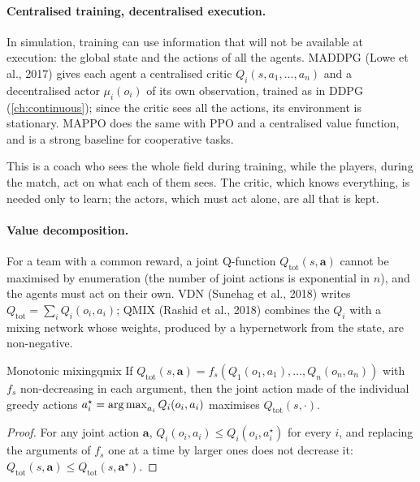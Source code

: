 \paragraph{Centralised training, decentralised execution.} In simulation,
training can use information that will not be available at execution: the
global state and the actions of all the agents. MADDPG (Lowe et al., 2017)
gives each agent a centralised critic $Q_i(s, a_1, \dots, a_n)$ and a
decentralised actor $\mu_i(o_i)$ of its own observation, trained as in DDPG
(\cref{ch:continuous}); since the critic sees all the actions, its
environment is stationary. MAPPO does the same with PPO and a centralised
value function, and is a strong baseline for cooperative tasks.

\begin{intuition}
  This is a coach who sees the whole field during training, while the
  players, during the match, act on what each of them sees. The critic,
  which knows everything, is needed only to learn; the actors, which must
  act alone, are all that is kept.
\end{intuition}

\paragraph{Value decomposition.} For a team with a common reward, a joint
Q-function $Q_{\mathrm{tot}}(s, \mathbf{a})$ cannot be maximised by
enumeration (the number of joint actions is exponential in $n$), and the
agents must act on their own. VDN (Sunehag et al., 2018) writes
$Q_{\mathrm{tot}} = \sum_i Q_i(o_i, a_i)$; QMIX (Rashid et al., 2018)
combines the $Q_i$ with a mixing network whose weights, produced by a
hypernetwork from the state, are non-negative.

\begin{proposition}{Monotonic mixing}{qmix}
  If $Q_{\mathrm{tot}}(s, \mathbf{a}) = f_s(Q_1(o_1, a_1), \dots, Q_n(o_n,
  a_n))$ with $f_s$ non-decreasing in each argument, then the joint action
  made of the individual greedy actions $a_i^\star = \operatorname*{arg\,max}_{a_i} Q_i(o_i,
  a_i)$ maximises $Q_{\mathrm{tot}}(s, \cdot)$.
\end{proposition}

\begin{proof}
  For any joint action $\mathbf{a}$, $Q_i(o_i, a_i) \leq Q_i(o_i,
  a_i^\star)$ for every $i$, and replacing the arguments of $f_s$ one at a
  time by larger ones does not decrease it: $Q_{\mathrm{tot}}(s, \mathbf{a})
  \leq Q_{\mathrm{tot}}(s, \mathbf{a}^\star)$.
\end{proof}

